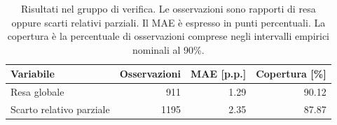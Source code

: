 \begin{table}[H]
\centering
\small
\begin{tabularx}{\linewidth}{@{}Xrrr@{}}
\toprule
\textbf{Variabile} & \textbf{Osservazioni} & \textbf{MAE [p.p.]} & \textbf{Copertura [\%]} \\
\midrule
Resa globale & \num{911} & \num{1.29} & \num{90.12} \\
Scarto relativo parziale & \num{1195} & \num{2.35} & \num{87.87} \\
\bottomrule
\end{tabularx}
\caption{Risultati nel gruppo di verifica. Le osservazioni sono rapporti di resa oppure scarti relativi parziali. Il MAE è espresso in punti percentuali. La copertura è la percentuale di osservazioni comprese negli intervalli empirici nominali al 90\%.}
\label{tab:mass-imputer-validation}
\end{table}
